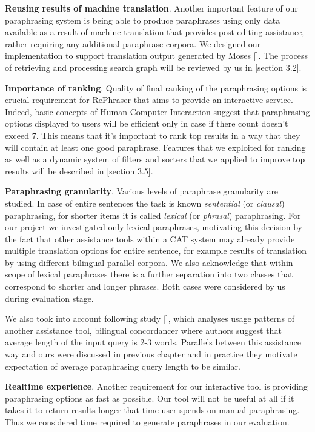 \textbf{Reusing results of machine translation}. Another important feature of our paraphrasing system is being able to produce paraphrases using only data available as a result of machine translation that provides post-editing assistance, rather requiring any additional paraphrase corpora. We designed our implementation to support translation output generated by Moses []. The process of retrieving and processing search graph will be reviewed by us in [section 3.2].

\textbf{Importance of ranking}. Quality of final ranking of the paraphrasing options is crucial requirement for RePhraser that aims to provide an interactive service. Indeed, basic concepts of Human-Computer Interaction suggest that paraphrasing options displayed to users will be efficient only in case if there count doesn't exceed 7. This means that it's important to rank top results in a way that they will contain at least one good paraphrase. Features that we exploited for ranking as well as a dynamic system of filters and sorters that we applied to improve top results will be described in [section 3.5].  


\textbf{Paraphrasing granularity}. Various levels of paraphrase granularity are studied. In case of entire sentences the task is known \textit{sentential} (or \textit{clausal}) paraphrasing, for shorter items it is called \textit{lexical} (or \textit{phrasal}) paraphrasing. For our project we investigated only lexical paraphrases, motivating this decision by the fact that other assistance tools within a CAT system may already provide multiple translation options for entire sentence, for example results of translation by using different bilingual parallel corpora. We also acknowledge that within scope of lexical paraphrases there is a further separation into two classes that correspond to shorter and longer phrases. Both cases were considered by us during evaluation stage.

We also took into account following study {[]}, which analyses usage patterns of another assistance tool, bilingual concordancer where authors suggest that average length of the input query is 2-3 words. Parallels between this assistance way and ours were discussed in previous chapter and in practice they motivate expectation of average paraphrasing query length to be similar.

\textbf{Realtime experience}. Another requirement for our interactive tool is providing paraphrasing options as fast as possible. Our tool will not be useful at all if it takes it to return results longer that time user spends on manual paraphrasing. Thus we considered time required to generate paraphrases in our evaluation. 

